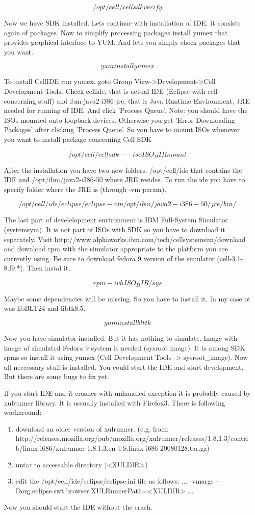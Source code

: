$$
/opt/cell/cellsdk verify
$$

Now we have SDK installed. Lets continue with installation of IDE. It consists again of packages. Now to simplify processing packages install yumex that provides graphical interface to YUM. And lets you simply check packages that you want.

$$
yum install yumex
$$

To install CellIDE run yumex, goto Group View->Development->Cell Development Tools. Check cellide, that is actual IDE (Eclipse with cell concerning stuff) and ibm-java2-i386-jre, that is Java Runtime Environment, JRE needed for running of IDE. And click 'Process Queue'. Note: you should have the ISOs mounted onto loopback devices. Otherwise you get 'Error Downloading Packages' after clicking 'Process Queue'. So you have to mount ISOs whenever you want to install package concerning Cell SDK

$$
/opt/cell/cellsdk --iso ISO_DIR mount
$$

After the installation you have two new folders. /opt/cell/ide that contains the IDE and /opt/ibm/java2-i386-50 where JRE resides. To run the ide you have to specify folder where the JRE is (through -vm param).

$$
/opt/cell/ide/eclipse/eclipse -vm /opt/ibm/java2-i386-50/jre/bin/
$$

The last part of develelopment environment is IBM Full-System Simulator (systemsym). It is not part of ISOs with SDK so you have to download it separately. Visit http://www.alphaworks.ibm.com/tech/cellsystemsim/download and download rpm with the simulator appropriate to the platform you are currently using. Be sure to download fedora 9 version of the simulator (cell-3.1-8.f9.*). Then instal it.

$$
rpm -ivh ISO_DIR/sys
$$

Maybe some dependencies will be missing. So you have to install it. In my case ot was libBLT24 and libtk8.5.

$$
yum install blt tk
$$

Now you have simulator installed. But it has nothing to simulate. Image with image of simulated Fedora 9 system is needed (sysroot image). It is among SDK rpms so install it using yumex (Cell Development Tools -> sysroot\_image).
Now all neccessary stuff is installed. You could start the IDE and start development. But there are some bugs to fix yet. 

If you start IDE and it crashes with unhandled exception it is probably caused by xulrunner library. It is ussually installed with Firefox3. There is following workaround:
\begin{enumerate}
\item download an older version of xulrunner. (e.g. from: http://releases.mozilla.org/pub/mozilla.org/xulrunner/releases/1.8.1.3/contrib/linux-i686/xulrunner-1.8.1.3.en-US.linux-i686-20080128.tar.gz)
\item untar to accessable directory (<XULDIR>)
\item edit the /opt/cell/ide/eclipse/eclipse.ini file as follows:
...
-vmargs
-Dorg.eclipse.swt.browser.XULRunnerPath=<XULDIR>
...
\end{enumerate}
Now you should start the IDE without the crash.

